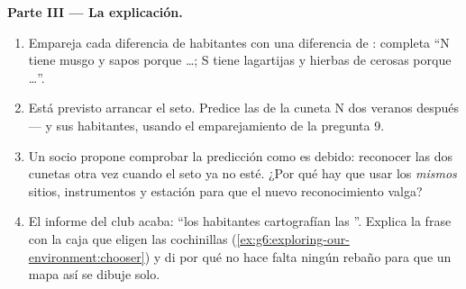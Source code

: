 \begin{problem}
\medskip\noindent\textbf{Parte III --- La explicación.}
\begin{enumerate}[resume]
  \item Empareja cada diferencia de habitantes con una diferencia de
        : completa ``N tiene musgo y sapos porque \dots; S
        tiene lagartijas y hierbas de  cerosas porque \dots''.
  \item Está previsto arrancar el seto. Predice las  de la
        cuneta N dos veranos después --- y sus habitantes, usando el
        emparejamiento de la pregunta 9.
  \item Un socio propone comprobar la predicción como es debido:
        reconocer las dos cunetas otra vez cuando el seto ya no esté.
        ¿Por qué hay que usar los \emph{mismos} sitios, instrumentos y
        estación para que el nuevo reconocimiento valga?
  \item El informe del club acaba: ``los habitantes cartografían las
        ''. Explica la frase con la caja que eligen las
        cochinillas (\cref{ex:g6:exploring-our-environment:chooser}) y
        di por qué no hace falta ningún rebaño para que un mapa así se
        dibuje solo.
\end{enumerate}
\end{problem}
